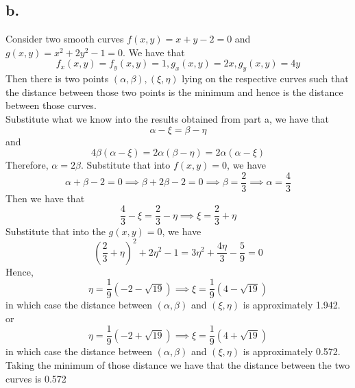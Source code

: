 \documentclass[11pt]{article}
\begin{document}
\subsection*{b.}
Consider two smooth curves $f(x,y) = x + y - 2 = 0$ and $g(x,y) = x^2+2y^2-1=0$.
We have that
\[
    f_x(x,y) = f_y(x,y) = 1, g_x(x,y) = 2x, g_y(x,y) = 4y    
\]
Then there is two points $(\alpha,\beta), (\xi,\eta)$ lying on the respective curves such that 
the distance between those two points is the minimum and hence is the distance between those curves. \\
Substitute what we know into the results obtained from part a, we have that
\[
    \alpha-\xi = \beta - \eta     
\] 
and 
\[
    4\beta (\alpha-\xi) = 2\alpha (\beta-\eta) = 2\alpha(\alpha-\xi)    
\]
Therefore, $\alpha = 2\beta$. Substitute that into $f(x,y) = 0$, we have
\[
    \alpha + \beta - 2 = 0 \implies \beta + 2\beta - 2 = 0 \implies \beta = \frac{2}{3} \implies \alpha = \frac{4}{3}    
\]
Then we have that
\[
    \frac{4}{3} - \xi = \frac{2}{3}- \eta \implies \xi = \frac{2}{3} + \eta
\]
Substitute that into the $g(x,y) = 0$, we have
\[
    \left(\frac{2}{3} + \eta\right)^2 + 2\eta^2 - 1 = 3 \eta^{2} + \frac{4 \eta}{3} - \frac{5}{9} = 0
\]
Hence, 
\[
    \eta = \frac{1}{9} (-2-\sqrt{19}) \implies \xi = \frac{1}{9}(4 - \sqrt{19})    
\]
in which case the distance between $(\alpha,\beta)$ and $(\xi,\eta)$ is approximately 1.942.
or 
\[
    \eta = \frac{1}{9} (-2+\sqrt{19}) \implies \xi = \frac{1}{9}(4 + \sqrt{19}) 
\]
in which case the distance between $(\alpha,\beta)$ and $(\xi,\eta)$ is approximately 0.572. \\
Taking the minimum of those distance we have that the distance between the two curves is 0.572
\pagebreak
\end{document}
